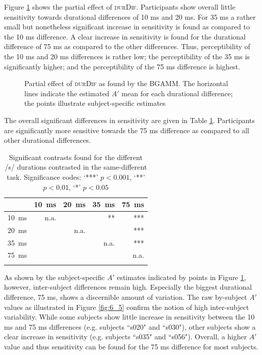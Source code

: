 Figure \ref{fig:6_4} shows the partial effect of \textsc{durDif}. Participants show overall little sensitivity towards durational differences of 10 ms and 20 ms. For 35 ms a rather small but nonetheless significant increase in sensitivity is found as compared to the 10 ms difference. A clear increase in sensitivity is found for the durational difference of 75 ms as compared to the other differences. Thus, perceptibility of the 10 ms and 20 ms differences is rather low; the perceptibility of the 35 ms is significantly higher; and the perceptibility of the 75 ms difference is highest.

\begin{figure}
    \centering
    
    \caption{Partial effect of \textsc{durDif} as found by the BGAMM. The horizontal lines indicate the estimated $A'$ mean for each durational difference; the points illustrate subject-specific estimates}
    \label{fig:6_4}
\end{figure}

The overall significant differences in sensitivity are given in Table \ref{tab:6.12}. Participants are significantly more sensitive towards the 75 ms difference as compared to all other durational differences. 

\begin{table}\fontsize{10}{11}
\caption{Significant contrasts found for the different /s/ durations contrasted in the same-different task. Significance codes: `***' $p < 0.001$, `**' $p < 0.01$, `*' $p < 0.05$}
\label{tab:6.12}
\centering
\begin{tabular}{lrrrr} 
\lsptoprule
\textbf{~} & 10~ms & 20~ms & 35~ms & 75~ms  \\ 
\midrule
10~ms      & n.a.  & ~     & **    & ***    \\
20~ms      & ~     & n.a.  & ~     & ***    \\
35~ms      & ~     & ~     & n.a.  & ***    \\
75~ms      & ~     & ~     & ~     & n.a.   \\
\lspbottomrule
\end{tabular}
\end{table}

As shown by the subject-specific $A'$ estimates indicated by points in Figure \ref{fig:6_4}, however, inter-subject differences remain high. Especially the biggest durational difference, 75 ms, shows a discernible amount of variation. The raw by-subject $A'$ values as illustrated in Figure \ref{fig:6_5} confirm the notion of high inter-subject variability. While some subjects show little increase in sensitivity between the 10 ms and 75 ms differences (e.g. subjects ``s020" and ``s030"), other subjects show a clear increase in sensitivity (e.g. subjects ``s035" and ``s056"). Overall, a higher $A'$ value and thus sensitivity can be found for the 75 ms difference for most subjects.


